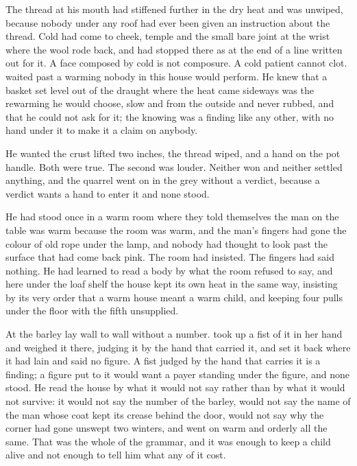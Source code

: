 The thread at his mouth had stiffened further in the dry heat and was unwiped, because nobody under any roof had ever been given an instruction about the thread. Cold had come to cheek, temple and the small bare joint at the wrist where the wool rode back, and had stopped there as at the end of a line written out for it. A face composed by cold is not composure. A cold patient cannot clot.  waited past a warming nobody in this house would perform. He knew that a basket set level out of the draught where the heat came sideways was the rewarming he would choose, slow and from the outside and never rubbed, and that he could not ask for it; the knowing was a finding like any other, with no hand under it to make it a claim on anybody.

He wanted the crust lifted two inches, the thread wiped, and a hand on the pot handle. Both were true. The second was louder. Neither won and neither settled anything, and the quarrel went on in the grey without a verdict, because a verdict wants a hand to enter it and none stood.

He had stood once in a warm room where they told themselves the man on the table was warm because the room was warm, and the man's fingers had gone the colour of old rope under the lamp, and nobody had thought to look past the surface that had come back pink. The room had insisted. The fingers had said nothing. He had learned to read a body by what the room refused to say, and here under the loaf shelf the house kept its own heat in the same way, insisting by its very order that a warm house meant a warm child, and keeping four pulls under the floor with the fifth unsupplied.

At  the barley lay wall to wall without a number.  took up a fist of it in her hand and weighed it there, judging it by the hand that carried it, and set it back where it had lain and said no figure. A fist judged by the hand that carries it is a finding; a figure put to it would want a payer standing under the figure, and none stood. He read the house by what it would not say rather than by what it would not survive: it would not say the number of the barley, would not say the name of the man whose coat kept its crease behind the door, would not say why the corner had gone unswept two winters, and went on warm and orderly all the same. That was the whole of the grammar, and it was enough to keep a child alive and not enough to tell him what any of it cost.

\scenebreak

